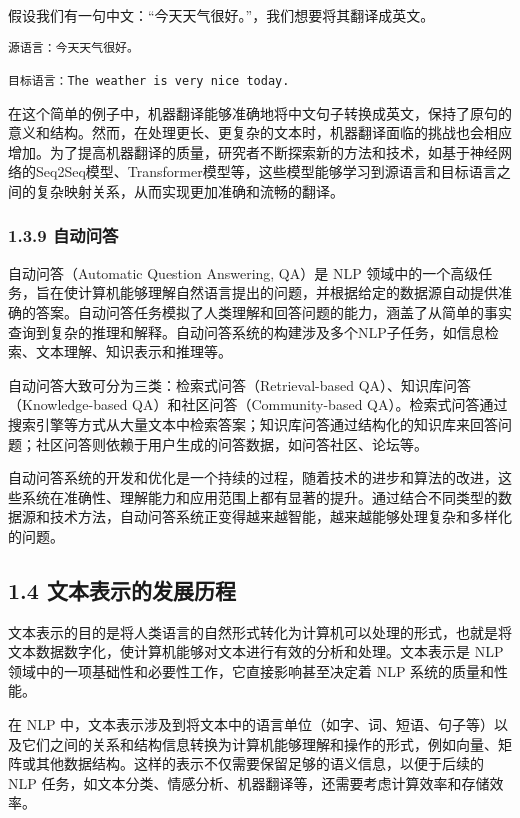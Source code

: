 \documentclass[12pt,a4paper]{book}
\begin{document}
假设我们有一句中文：``今天天气很好。''，我们想要将其翻译成英文。

\begin{verbatim}
源语言：今天天气很好。

目标语言：The weather is very nice today.
\end{verbatim}

在这个简单的例子中，机器翻译能够准确地将中文句子转换成英文，保持了原句的意义和结构。然而，在处理更长、更复杂的文本时，机器翻译面临的挑战也会相应增加。为了提高机器翻译的质量，研究者不断探索新的方法和技术，如基于神经网络的Seq2Seq模型、Transformer模型等，这些模型能够学习到源语言和目标语言之间的复杂映射关系，从而实现更加准确和流畅的翻译。

\subsubsection{1.3.9 自动问答}\label{ux81eaux52a8ux95eeux7b54}

自动问答（Automatic Question Answering, QA）是 NLP
领域中的一个高级任务，旨在使计算机能够理解自然语言提出的问题，并根据给定的数据源自动提供准确的答案。自动问答任务模拟了人类理解和回答问题的能力，涵盖了从简单的事实查询到复杂的推理和解释。自动问答系统的构建涉及多个NLP子任务，如信息检索、文本理解、知识表示和推理等。

自动问答大致可分为三类：检索式问答（Retrieval-based
QA）、知识库问答（Knowledge-based QA）和社区问答（Community-based
QA）。检索式问答通过搜索引擎等方式从大量文本中检索答案；知识库问答通过结构化的知识库来回答问题；社区问答则依赖于用户生成的问答数据，如问答社区、论坛等。

自动问答系统的开发和优化是一个持续的过程，随着技术的进步和算法的改进，这些系统在准确性、理解能力和应用范围上都有显著的提升。通过结合不同类型的数据源和技术方法，自动问答系统正变得越来越智能，越来越能够处理复杂和多样化的问题。

\subsection{1.4
文本表示的发展历程}\label{ux6587ux672cux8868ux793aux7684ux53d1ux5c55ux5386ux7a0b}

文本表示的目的是将人类语言的自然形式转化为计算机可以处理的形式，也就是将文本数据数字化，使计算机能够对文本进行有效的分析和处理。文本表示是
NLP 领域中的一项基础性和必要性工作，它直接影响甚至决定着 NLP
系统的质量和性能。

在 NLP
中，文本表示涉及到将文本中的语言单位（如字、词、短语、句子等）以及它们之间的关系和结构信息转换为计算机能够理解和操作的形式，例如向量、矩阵或其他数据结构。这样的表示不仅需要保留足够的语义信息，以便于后续的
NLP
任务，如文本分类、情感分析、机器翻译等，还需要考虑计算效率和存储效率。
\end{document}
